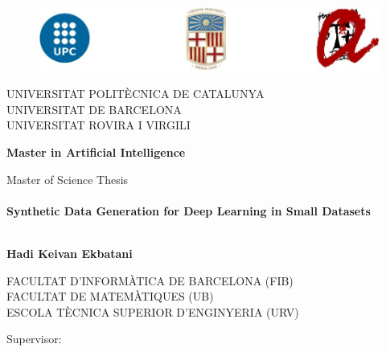\begin{titlepage}
	
	\begin{figure}[t]
		\centering
		\includegraphics[scale=0.5]{images/upc_ub_urv4}
	\end{figure}    
	
	
	\begin{center}
		
		{\large \uppercase{Universitat politècnica de Catalunya}} \medskip \\
		{\large \uppercase{Universitat de Barcelona}} \medskip \\
		{\large \uppercase{Universitat Rovira i Virgili}} \medskip \\
		\vspace*{1cm}
		\begin{center}
			\Large	\bf   Master in Artificial Intelligence
		\end{center}
		

		{\Large Master of Science Thesis} \vspace*{1.0cm} \\
		\HRule \\[0.3cm]
		{ \huge \bfseries Synthetic Data Generation for Deep Learning in Small Datasets }\\[0.4cm] %
%
		\HRule \\[1.cm]
	\end{center}

	
	\thispagestyle{empty}
	\begin{center}
	\Large	\bf Hadi Keivan Ekbatani\\
	\end{center}
	\begin{center}
		{\large \uppercase{Facultat d'informàtica de Barcelona (FIB)}} \medskip \\
		{\large \uppercase{Facultat de Matemàtiques (UB)}} \medskip \\
		{\large \uppercase{Escola tècnica superior d'enginyeria (URV)}} \medskip \\
	\end{center}
	\vspace*{1.cm}
	\begin{center} 
		\begin{multicols}{2}	
		{\large Supervisor:}
		

\end{multicols}
\end{center}
\end{titlepage}
